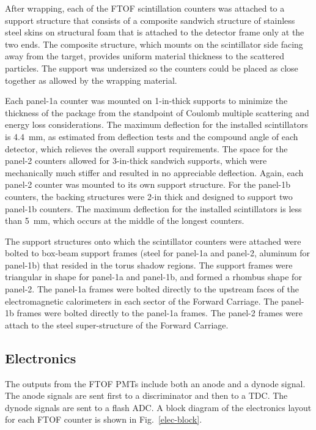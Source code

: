 \documentclass{elsart}
\begin{document}
After wrapping, each of the FTOF scintillation counters was attached to a support structure that consists of
a composite sandwich structure of stainless steel skins on structural foam that is attached to the detector
frame only at the two ends. The composite structure, which mounts on the scintillator side facing away from
the target, provides uniform material thickness to the scattered particles.  The support was undersized so the
counters could be placed as close together as allowed by the wrapping material. 

Each panel-1a counter was mounted on 1-in-thick supports to minimize the thickness of the package from the
standpoint of Coulomb multiple scattering and energy loss considerations.  The maximum deflection for the
installed scintillators is 4.4~mm, as estimated from deflection tests and the compound angle of each detector,
which relieves the overall support requirements. The space for the panel-2 counters allowed for 3-in-thick
sandwich supports, which were mechanically much stiffer and resulted in no appreciable deflection. Again, each
panel-2 counter was mounted to its own support structure. For the panel-1b counters, the backing structures
were 2-in thick and designed to support two panel-1b counters. The maximum deflection for the installed
scintillators is less than 5~mm, which occurs at the middle of the longest counters.

The support structures onto which the scintillator counters were attached were bolted to box-beam support
frames (steel for panel-1a and panel-2, aluminum for panel-1b) that resided in the torus shadow regions. The
support frames were triangular in shape for panel-1a and panel-1b, and formed a rhombus shape for panel-2.
The panel-1a frames were bolted directly to the upstream faces of the electromagnetic calorimeters in each
sector of the Forward Carriage. The panel-1b frames were bolted directly to the panel-1a frames. The panel-2
frames were attach to the steel super-structure of the Forward Carriage.

\subsection{Electronics}
\label{sec-elec}

The outputs from the FTOF PMTs include both an anode and a dynode signal. The anode signals are
sent first to a discriminator and then to a TDC. The dynode signals are sent to a flash ADC. A block
diagram of the electronics layout for each FTOF counter is shown in Fig.~\ref{elec-block}.
\end{document}
